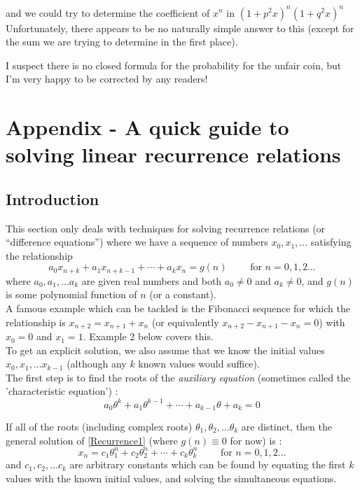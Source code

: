 \documentclass[a4paper,10pt]{article}
\begin{document}
\begin{flushleft}
and we could try to determine the coefficient of $x^n$ in $(1+p^2x)^n (1+q^2x)^n$ \\
Unfortunately, there appears to be no naturally simple answer to this (except for the sum we are trying to determine in the first place).

I suspect there is no closed formula for the probability for the unfair coin, but I'm very happy to be corrected by any readers! 


\clearpage

\section{Appendix - A quick guide to solving linear recurrence relations}
\subsection{Introduction}

This section only deals with techniques for solving recurrence relations (or ``difference equations'') where we have a sequence of numbers 
$x_0, x_1, \ldots$ satisfying the relationship
\begin{equation} 
a_0x_{n+k} + a_1x_{n+k-1} + \cdots + a_kx_n = g(n) \qquad \text{ for } n = 0, 1, 2 \ldots
\tag{R1} \label{Recurrence1}
\end{equation}
where $a_0, a_1, \ldots a_k$ are given real numbers and both $a_0 \neq 0$ and $a_k \neq 0$, and $g(n)$ is some polynomial function of $n$ (or a constant).
\\
A famous example which can be tackled is the Fibonacci sequence for which the relationship is $x_{n+2} = x_{n+1} + x_n$ (or equivalently  $x_{n+2} - x_{n+1} - x_n = 0$) with $x_0=0$ and $x_1=1$.
Example 2 below covers this. 
\\
To get an explicit solution, we also assume that we know the initial values $x_0, x_1, \ldots x_{k-1}$ (although any $k$ known values would suffice). 
\\
The first step is to find the roots of the \emph{auxiliary equation} (sometimes called the 'characteristic equation') :  
\begin{equation} 
a_0\theta^{k} + a_1\theta^{k-1} + \cdots + a_{k-1}\theta + a_k = 0
\end{equation}

If all of the roots (including complex roots) $\theta_1, \theta_2, \ldots \theta_k$ are distinct, then the general solution of  \eqref{Recurrence1} (where $g(n) \equiv 0$ for now) is :
\begin{equation} 
x_n = c_1\theta_1^{n} + c_2\theta_2^{n} + \cdots + c_k\theta_k^{n} \qquad \text{ for } n = 0, 1, 2 \ldots
\end{equation}
and $c_1, c_2, \ldots c_k$ are arbitrary constants which can be found by equating the first $k$ values with the known initial values, and solving the simultaneous equations.
  

\end{flushleft}
\end{document}
